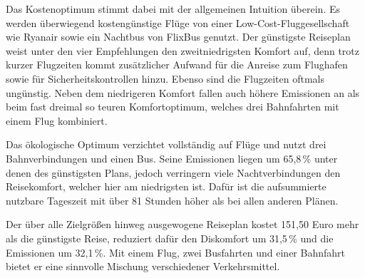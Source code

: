 Das Kostenoptimum stimmt dabei mit der allgemeinen Intuition überein. Es werden überwiegend kostengünstige Flüge von einer Low-Cost-Fluggesellschaft wie Ryanair sowie ein Nachtbus von FlixBus genutzt. Der günstigste Reiseplan weist unter den vier Empfehlungen den zweitniedrigsten Komfort auf, denn trotz kurzer Flugzeiten kommt zusätzlicher Aufwand für die Anreise zum Flughafen sowie für Sicherheitskontrollen hinzu. Ebenso sind die Flugzeiten oftmals ungünstig. Neben dem niedrigeren Komfort fallen auch höhere Emissionen an als beim fast dreimal so teuren Komfortoptimum, welches
 drei Bahnfahrten mit einem Flug kombiniert.

Das ökologische Optimum verzichtet vollständig auf Flüge und nutzt drei Bahnverbindungen und einen Bus. Seine Emissionen
liegen um 65,8\,\% unter denen des günstigsten Plans, jedoch verringern viele Nachtverbindungen den Reisekomfort, welcher hier am niedrigsten ist. Dafür ist die aufsummierte nutzbare Tageszeit
mit über 81 Stunden höher als bei allen anderen Plänen.

Der über alle Zielgrößen hinweg ausgewogene Reiseplan kostet 151,50 Euro mehr als die günstigste Reise, reduziert
dafür den Diskomfort um 31,5\,\% und die Emissionen um 32,1\,\%.
Mit einem Flug, zwei Busfahrten und einer Bahnfahrt bietet er eine sinnvolle Mischung verschiedener Verkehrsmittel.
